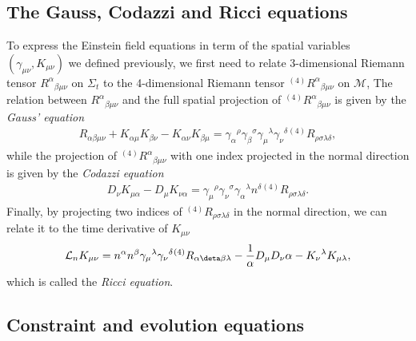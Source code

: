 \subsection{The Gauss, Codazzi and Ricci equations}
\label{section1.2.4}

To express the Einstein field equations in term of the spatial variables $(\gamma_{\mu\nu}, K_{\mu\nu})$ we defined previously,
we first need to relate 3-dimensional Riemann tensor $R^\alpha{}_{\beta\mu\nu}$ on $\Sigma_t$ to the 4-dimensional Riemann tensor ${}^{(4)}R^\alpha{}_{\beta\mu\nu}$ on $\mathcal{M}$,
The relation between $R^\alpha{}_{\beta\mu\nu}$ and the full spatial projection of ${}^{(4)}R^\alpha{}_{\beta\mu\nu}$ is given by the \textit{Gauss' equation}
\begin{align}\label{eq:Gauss}
    R_{\alpha\beta\mu\nu} + K_{\alpha\mu}K_{\beta\nu} - K_{\alpha\nu} K_{\beta\mu} = \gamma_{\alpha}{}^{\rho} \gamma_{\beta}{}^{\sigma} \gamma_{\mu}{}^{\lambda} \gamma_{\nu}{}^{\delta} {}^{(4)}R_{\rho\sigma\lambda\delta},
\end{align}
while the projection of ${}^{(4)}R^\alpha{}_{\beta\mu\nu}$ with one index projected in the normal direction is given by the \textit{Codazzi equation}
\begin{align}\label{eq:Codazzi}
    D_{\nu} K_{\mu\alpha} - D_{\mu} K_{\nu\alpha} = \gamma_{\mu}{}^{\rho} \gamma_{\nu}{}^{\sigma} \gamma_{\alpha}{}^{\lambda} n^{\delta} {}^{(4)}R_{\rho\sigma\lambda\delta}.
\end{align}
Finally, by projecting two indices of ${}^{(4)}R_{\rho\sigma\lambda\delta}$ in the normal direction,
we can relate it to the time derivative of $K_{\mu\nu}$
\begin{align}\label{eq:Ricci}
    \mathcal{L}_n K_{\mu\nu} = n^{\alpha} n^{\beta} \gamma_{\mu}{}^{\lambda} \gamma_{\nu}{}^{\delta} {}^{(4)}R_{\alpha\deta\beta\lambda} - \frac{1}{\alpha} D_{\mu} D_\nu \alpha - K_{\nu}{}^{\lambda}K_{\mu\lambda},
\end{align}
which is called the \textit{Ricci equation}.

\subsection{Constraint and evolution equations} %
\label{section1.2.5}

